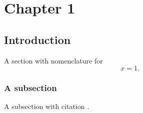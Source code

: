 \chapter{Chapter 1}

\section{Introduction}
A section with nomenclature for \[x=1.\]

%

\subsection{A subsection}

A subsection with citation \cite{Eliades2010}.